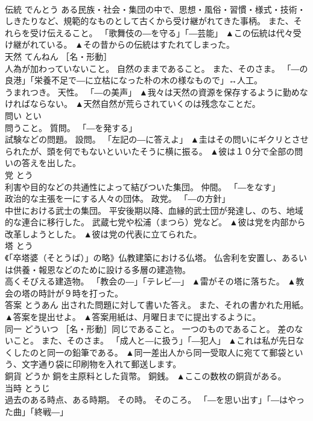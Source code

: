 \documentclass[8pt]{extreport}
\begin{document}
\begin{CJK}{UTF8}{min}
\\	伝統	でんとう	ある民族・社会・集団の中で、思想・風俗・習慣・様式・技術・しきたりなど、規範的なものとして古くから受け継がれてきた事柄。 また、それらを受け伝えること。 「歌舞伎の―を守る」「―芸能」	▲この伝統は代々受け継がれている。 ▲その昔からの伝統はすたれてしまった。
\\	天然	てんねん	［名・形動］ 
\\	人為が加わっていないこと。 自然のままであること。 また、そのさま。 「―の良港」「栄養不足で―に立枯になった朴の木の様なもので」↔人工。 
\\	うまれつき。 天性。 「―の美声」	▲我々は天然の資源を保存するように勤めなければならない。 ▲天然自然が荒らされていくのは残念なことだ。
\\	問い	とい	
\\	問うこと。 質問。 「―を発する」 
\\	試験などの問題。 設問。 「左記の―に答えよ」	▲圭はその問いにギクリとさせられたが、頭を何でもないといいたそうに横に振る。 ▲彼は１０分で全部の問いの答えを出した。
\\	党	とう	
\\	利害や目的などの共通性によって結びついた集団。 仲間。 「―をなす」 
\\	政治的な主張を一にする人々の団体。 政党。 「―の方針」 
\\	中世における武士の集団。 平安後期以降、血縁的武士団が発達し、のち、地域的な連合に移行した。 武蔵七党や松浦（まつら）党など。	▲彼は党を内部から改革しようとした。 ▲彼は党の代表に立てられた。
\\	塔	とう	
\\	《「卒塔婆（そとうば）」の略》仏教建築における仏塔。 仏舎利を安置し、あるいは供養・報恩などのために設ける多層の建造物。 
\\	高くそびえる建造物。 「教会の―」「テレビ―」	▲雷がその塔に落ちた。 ▲教会の塔の時計が９時を打った。
\\	答案	とうあん	出された問題に対して書いた答え。 また、それの書かれた用紙。	▲答案を提出せよ。 ▲答案用紙は、月曜日までに提出するように。
\\	同一	どういつ	［名・形動］同じであること。 一つのものであること。 差のないこと。 また、そのさま。 「成人と―に扱う」「―犯人」	▲これは私が先日なくしたのと同一の鉛筆である。 ▲同一差出人から同一受取人に宛てて郵袋という、文字通り袋に印刷物を入れて郵送します。
\\	銅貨	どうか	銅を主原料とした貨幣。 銅銭。	▲ここの数枚の銅貨がある。
\\	当時	とうじ	
\\	過去のある時点、ある時期。 その時。 そのころ。 「―を思い出す」「―はやった曲」「終戦―」 

\end{CJK}
\end{document}

